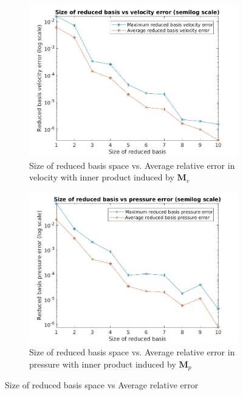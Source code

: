\documentclass[graybox]{svmult}
\begin{document}
\begin{figure}[H]
\begin{subfigure}{0.48\textwidth}
\includegraphics[width=\linewidth]{size_vs_reduced_basis_velocity_error_semilog.jpg}
\caption{Size of reduced basis space vs. Average relative error in velocity with inner product induced by $\bm{M}_v$} \label{error_vs_basis_velocity}
\end{subfigure}\hspace*{\fill}
\begin{subfigure}{0.48\textwidth}
\includegraphics[width=\linewidth]{size_vs_reduced_basis_pressure_error_semilog.jpg}
\caption{Size of reduced basis space vs. Average relative error in pressure with inner product induced by $\bm{M}_p$} \label{error_vs_basis_pressure}
\end{subfigure}
  \caption{Size of reduced basis space vs Average relative error} 
\label{error_vs_basis}
\end{figure}
\end{document}
